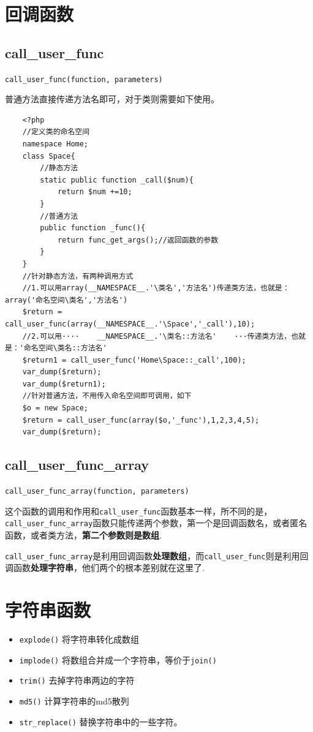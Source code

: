 \documentclass[UTF8,a4paper,12pt]{ctexbook}
\begin{document}
	
	\section{回调函数}
		\subsection{call\_user\_func}
			\verb|call_user_func(function, parameters)|
			
			普通方法直接传递方法名即可，对于类则需要如下使用。
			
			\begin{lstlisting}
	<?php
	//定义类的命名空间
	namespace Home;
	class Space{
	    //静态方法
	    static public function _call($num){
	        return $num +=10;
	    }
	    //普通方法
	    public function _func(){
	        return func_get_args();//返回函数的参数
	    }
	}
	//针对静态方法，有两种调用方式
	//1.可以用array(__NAMESPACE__.'\类名','方法名')传递类方法，也就是：array('命名空间\类名','方法名')
	$return = call_user_func(array(__NAMESPACE__.'\Space','_call'),10);
	//2.可以用····    __NAMESPACE__.'\类名::方法名'    ···传递类方法，也就是：'命名空间\类名::方法名'
	$return1 = call_user_func('Home\Space::_call',100);
	var_dump($return);
	var_dump($return1);
	//针对普通方法，不用传入命名空间即可调用，如下
	$o = new Space;
	$return = call_user_func(array($o,'_func'),1,2,3,4,5);
	var_dump($return);
			\end{lstlisting}
		\subsection{call\_user\_func\_array}
			\verb|call_user_func_array(function, parameters)|
			
			这个函数的调用和作用和\verb|call_user_func|函数基本一样，所不同的是，\verb|call_user_func_array|函数只能传递两个参数，第一个是回调函数名，或者匿名函数，或者类方法，\textbf{第二个参数则是数组}.
		
			\verb|call_user_func_array|是利用回调函数\textbf{处理数组}，而\verb|call_user_func|则是利用回调函数\textbf{处理字符串}，他们两个的根本差别就在这里了.
	\section{字符串函数}
		\begin{itemize}
			\item \verb|explode()| 将字符串转化成数组
			\item \verb|implode()| 将数组合并成一个字符串，等价于\verb|join()|
			\item \verb|trim()| 去掉字符串两边的字符
			\item \verb|md5()| 计算字符串的md5散列
			\item \verb|str_replace()| 替换字符串中的一些字符。
		\end{itemize}		
\end{document}

